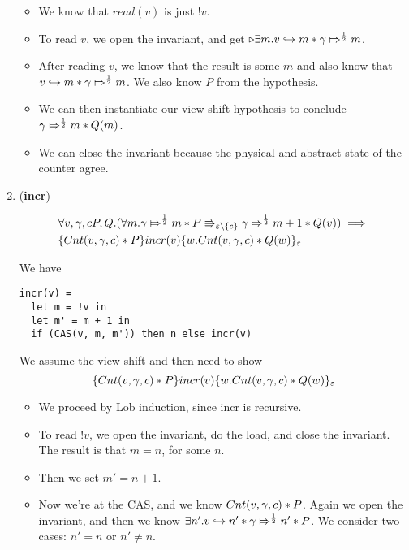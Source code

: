 \begin{enumerate}
\begin{itemize}
\item We know that $read(v)$ is just $!v$.
\item To read $v$, we open the invariant, and get $\latermod{\exists m. \pointsto{v}{m} * \apointsto{\gamma}{m}{\frac{1}{2}}}$.
\item After reading $v$, we know that the result is some $m$ and also know that $\pointsto{v}{m} * \apointsto{\gamma}{m}{\frac{1}{2}}$. We also know $P$ from the hypothesis.
\item We can then instantiate our view shift hypothesis to conclude $\apointsto{\gamma}{m}{\frac{1}{2}} * Q(m)$.
\item We can close the invariant because the physical and abstract state of the counter agree.
\end{itemize}

\item (\textbf{incr})

\begin{align*}
& \forall v, \gamma, c P, Q. (\forall m. \apointsto{\gamma}{m}{\frac{1}{2}} * P \Rrightarrow_{\varepsilon \backslash \{c\}} \apointsto{\gamma}{m + 1}{\frac{1}{2}} * Q(v)) \implies \\
& \hot{\Cnt{v}{\gamma}{c} * P}{incr(v)}{w. \Cnt{v}{\gamma}{c} * Q(w)}_{\varepsilon} 
\end{align*}

We have 
\begin{verbatim}
incr(v) =
  let m = !v in
  let m' = m + 1 in
  if (CAS(v, m, m')) then n else incr(v)
\end{verbatim}

We assume the view shift and then need to show
\[ \hot{\Cnt{v}{\gamma}{c} * P}{incr(v)}{w. \Cnt{v}{\gamma}{c} * Q(w)}_{\varepsilon}  \]

\begin{itemize}
\item We proceed by Lob induction, since incr is recursive.

\item To read $!v$, we open the invariant, do the load, and close the invariant. The result is that $m = n$, for some $n$.

\item Then we set $m' = n + 1$.

\item Now we're at the CAS, and we know $\Cnt{v}{\gamma}{c} * P$. Again we open the invariant, and then we know $\exists n'. \pointsto{v}{n'} * \apointsto{\gamma}{n'}{\frac{1}{2}} * P$. We consider two cases: $n' = n$ or $n' \ne n$.


\end{itemize}
\end{enumerate}
